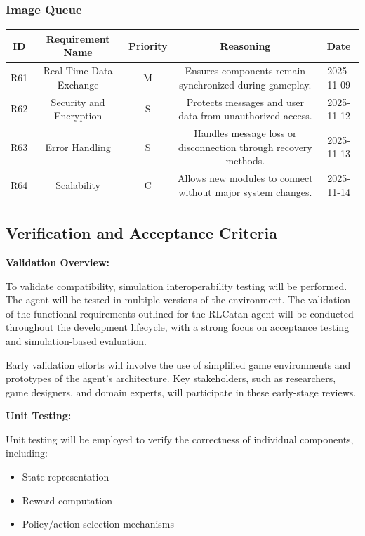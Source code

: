 \documentclass{article}
\begin{document}
\vspace{1em}

\subsubsection*{Image Queue}

\begin{tabular}{|c|c|c|c|c|}
\hline
\textbf{ID} & \textbf{Requirement Name} & \textbf{Priority} &
\textbf{Reasoning} & \textbf{Date} \\
\hline
R61 & Real-Time Data Exchange & M &
\parbox[t]{4cm}{Ensures components remain synchronized during
gameplay.} &
2025-11-09 \\
\hline
R62 & Security and Encryption & S &
\parbox[t]{4cm}{Protects messages and user data from unauthorized
access.} &
2025-11-12 \\
\hline
R63 & Error Handling & S &
\parbox[t]{4cm}{Handles message loss or disconnection through
recovery methods.} &
2025-11-13 \\
\hline
R64 & Scalability & C &
\parbox[t]{4cm}{Allows new modules to connect without major system
changes.} &
2025-11-14 \\
\hline
\end{tabular}


\subsection{Verification and Acceptance Criteria}\label{subsec:verification-and-acceptance-criteria}

\noindent\textbf{Validation Overview:}

To validate compatibility, simulation interoperability testing will be performed. The \RL{} agent will be tested in multiple versions of the environment. The validation of the functional requirements outlined for the RLCatan agent will be conducted throughout the development lifecycle, with a strong focus on acceptance testing and simulation-based evaluation.

Early validation efforts will involve the use of simplified \emph{\Catan{}} game environments and prototypes of the \RL{} agent's architecture. Key stakeholders, such as \AI{} researchers, game designers, and domain experts, will participate in these early-stage reviews.

\vspace{1em}

\noindent\textbf{Unit Testing:}

Unit testing will be employed to verify the correctness of individual components, including:
\begin{itemize}
    \item State representation
    \item Reward computation
    \item Policy/action selection mechanisms
\end{itemize}
\end{document}
